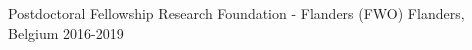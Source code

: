 



\begin{cvhonors}

  \cvhonor
    {Postdoctoral Fellowship} %
    {Research Foundation - Flanders (FWO)} %
    {Flanders, Belgium} %
    {2016-2019} %

\end{cvhonors}






